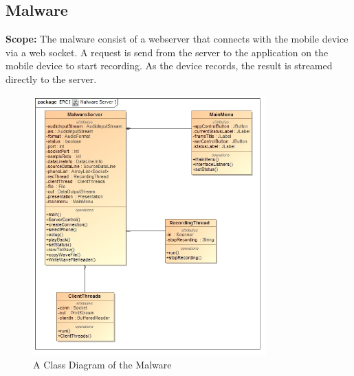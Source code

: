 \documentclass[a4paper,12pt,titlepage]{article}
\begin{document}
\newpage
		
		\subsection{Malware}
		\textbf{Scope: } The malware consist of a webserver that connects with the mobile device via a web socket. A request is send from the server to the application on the mobile device to start recording. As the device records, the result is streamed directly to the server.
		\begin{figure}[h!]
 			 \centering
			  \includegraphics[width=0.8\textwidth]{MalwareClass}
		 	 \caption{A Class Diagram of the Malware}
		\end{figure}
\end{document}
